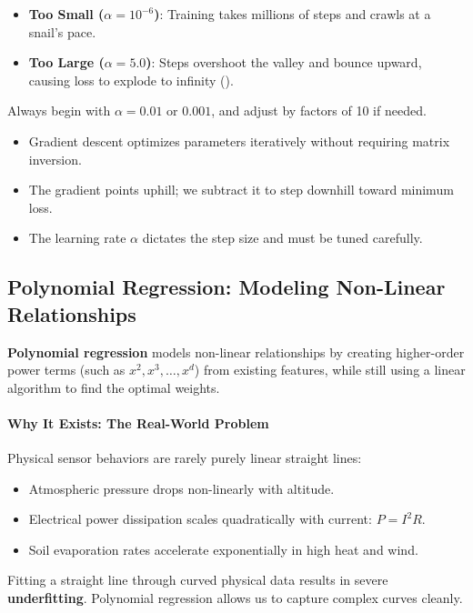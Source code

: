 \begin{warning}
\begin{itemize}
    \item \textbf{Too Small ($\alpha = 10^{-6}$)}: Training takes millions of steps and crawls at a snail's pace.
    \item \textbf{Too Large ($\alpha = 5.0$)}: Steps overshoot the valley and bounce upward, causing loss to explode to infinity ().
\end{itemize}
Always begin with $\alpha = 0.01$ or $0.001$, and adjust by factors of 10 if needed.
\end{warning}

\begin{takeaways}
\begin{itemize}
    \item Gradient descent optimizes parameters iteratively without requiring matrix inversion.
    \item The gradient points uphill; we subtract it to step downhill toward minimum loss.
    \item The learning rate $\alpha$ dictates the step size and must be tuned carefully.
\end{itemize}
\end{takeaways}

\subsection{Polynomial Regression: Modeling Non-Linear Relationships}

\begin{keyidea}
\textbf{Polynomial regression} models non-linear relationships by creating higher-order power terms (such as $x^2, x^3, \dots, x^d$) from existing features, while still using a linear algorithm to find the optimal weights.
\end{keyidea}

\paragraph{Why It Exists: The Real-World Problem}
Physical sensor behaviors are rarely purely linear straight lines:
\begin{itemize}
    \item Atmospheric pressure drops non-linearly with altitude.
    \item Electrical power dissipation scales quadratically with current: $P = I^2 R$.
    \item Soil evaporation rates accelerate exponentially in high heat and wind.
\end{itemize}
Fitting a straight line through curved physical data results in severe \textbf{underfitting}. Polynomial regression allows us to capture complex curves cleanly.


